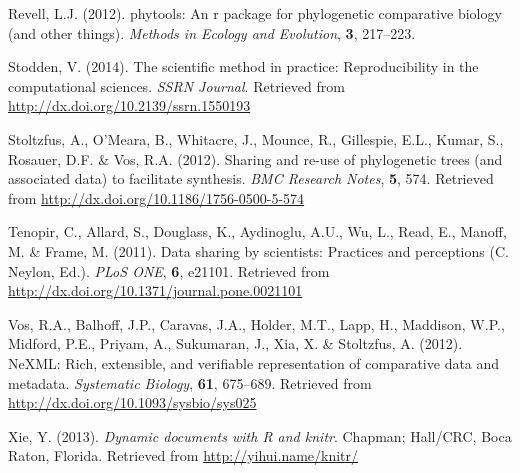 \documentclass[author-year, review, 11pt]{components/elsarticle} %
\begin{document}
Revell, L.J. (2012). phytools: An r package for phylogenetic comparative
biology (and other things). \emph{Methods in Ecology and Evolution},
\textbf{3}, 217--223.

Stodden, V. (2014). The scientific method in practice: Reproducibility
in the computational sciences. \emph{SSRN Journal}. Retrieved from
\url{http://dx.doi.org/10.2139/ssrn.1550193}

Stoltzfus, A., O'Meara, B., Whitacre, J., Mounce, R., Gillespie, E.L.,
Kumar, S., Rosauer, D.F. \& Vos, R.A. (2012). Sharing and re-use of
phylogenetic trees (and associated data) to facilitate synthesis.
\emph{BMC Research Notes}, \textbf{5}, 574. Retrieved from
\url{http://dx.doi.org/10.1186/1756-0500-5-574}

Tenopir, C., Allard, S., Douglass, K., Aydinoglu, A.U., Wu, L., Read,
E., Manoff, M. \& Frame, M. (2011). Data sharing by scientists:
Practices and perceptions (C. Neylon, Ed.). \emph{PLoS ONE}, \textbf{6},
e21101. Retrieved from
\url{http://dx.doi.org/10.1371/journal.pone.0021101}

Vos, R.A., Balhoff, J.P., Caravas, J.A., Holder, M.T., Lapp, H.,
Maddison, W.P., Midford, P.E., Priyam, A., Sukumaran, J., Xia, X. \&
Stoltzfus, A. (2012). NeXML: Rich, extensible, and verifiable
representation of comparative data and metadata. \emph{Systematic
Biology}, \textbf{61}, 675--689. Retrieved from
\url{http://dx.doi.org/10.1093/sysbio/sys025}

Xie, Y. (2013). \emph{Dynamic documents with R and knitr}. Chapman;
Hall/CRC, Boca Raton, Florida. Retrieved from
\url{http://yihui.name/knitr/}
\end{document}
